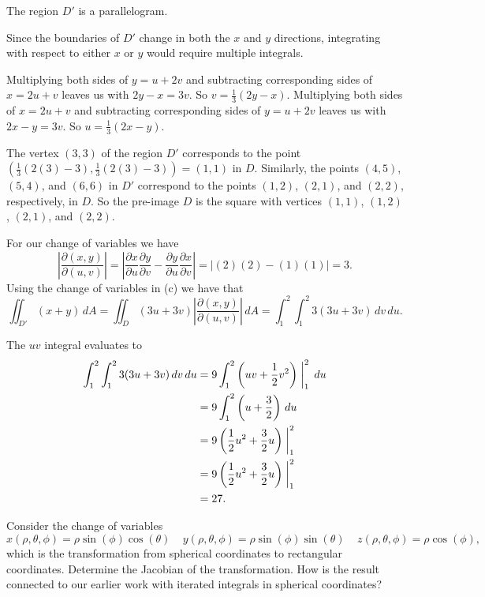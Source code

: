 \begin{exercises}
\begin{exerciseSolution}
	\ba
	 	\item The region $D'$ is a parallelogram. 
		\item Since the boundaries of $D'$ change in both the $x$ and $y$ directions, integrating with respect to either $x$ or $y$ would require multiple integrals. 
		\item Multiplying both sides of $y=u+2v$ and subtracting corresponding sides of $x = 2u + v$ leaves us with $2y-x = 3v$. So $v = \frac{1}{3}(2y-x)$. Multiplying both sides of $x = 2u + v$ and subtracting corresponding sides of $y=u+2v$ leaves us with $2x-y = 3v$. So $u = \frac{1}{3}(2x-y)$.
		\item The vertex $(3,3)$ of the region $D'$ corresponds to the point $\left(\frac{1}{3}(2(3)-3), \frac{1}{3}(2(3)-3)\right) = (1,1)$ in $D$. Similarly, the points $(4,5)$, $(5,4)$, and $(6,6)$ in $D'$ correspond to the points $(1,2)$, $(2,1)$, and $(2,2)$, respectively, in $D$. So the pre-image $D$ is the square with vertices $(1,1)$, $(1,2)$, $(2,1)$, and $(2,2)$. 
		\item For our change of variables we have 
\[\left|\frac{\partial (x,y)}{\partial (u,v)}\right| = \left| \frac{\partial x}{\partial u} \frac{\partial y}{\partial v} - \frac{\partial y}{\partial u} \frac{\partial x}{\partial v} \right| = \left|(2)(2) - (1)(1) \right| = 3.\]
Using the change of variables in (c) we have that  
\[\iint_{D'} (x+y) \, dA = \iint_{D} (3u+3v) \left|\frac{\partial (x,y)}{\partial (u,v)}\right| \, dA = \int_{1}^{2} \int_{1}^{2} 3(3u+3v) \, dv \, du.\]
		\item The $uv$ integral evaluates to 
\begin{align*}
\int_{1}^{2} \int_{1}^{2} 3(3u+3v) \, dv \, du &= 9\int_{1}^{2}  \left(uv+\frac{1}{2}v^2\right)\biggm|_{1}^{2}  \, du \\
	&= 9\int_{1}^{2}  \left(u+\frac{3}{2}\right)  \, du \\
	&= 9\left(\frac{1}{2}u^2+\frac{3}{2}u\right)\biggm|_{1}^{2} \\
	&= 9\left(\frac{1}{2}u^2+\frac{3}{2}u\right)\biggm|_{1}^{2} \\
	&= 27.
\end{align*}
	\ea
\end{exerciseSolution}

\item Consider the change of variables
\[x(\rho, \theta, \phi) = \rho \sin(\phi) \cos(\theta) \ \ \ \ \ y(\rho, \theta, \phi) = \rho \sin(\phi) \sin(\theta) \ \ \ \ \ z(\rho, \theta, \phi) = \rho \cos(\phi),\]
which is the transformation from spherical coordinates to rectangular coordinates.  Determine the Jacobian of the transformation.  How is the result connected to our earlier work with iterated integrals in spherical coordinates?


\end{exercises}
